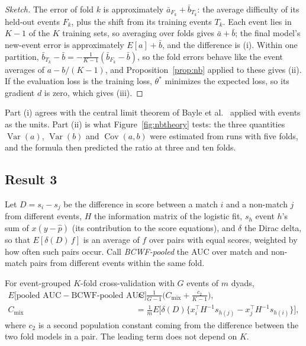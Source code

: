 \begin{proof}[Sketch]
The error of fold $k$ is approximately $\bar a_{F_k}+\bar b_{T_k}$: the average difficulty of its held-out events $F_k$, plus
the shift from its training events $T_k$. Each event lies in $K-1$ of the $K$ training sets, so averaging over folds gives
$\bar a+\bar b$; the final model's new-event error is approximately $E[a]+\bar b$, and the difference is (i). Within one
partition, $\bar b_{T_k}-\bar b=-\frac{1}{K-1}(\bar b_{F_k}-\bar b)$, so the fold errors behave like the event averages of $a-b/(K-1)$, and
Proposition~\ref{prop:nb} applied to these gives (ii). If the evaluation loss is the training loss, $\theta^*$ minimizes the
expected loss, so its gradient $d$ is zero, which gives (iii).
\end{proof}

Part (i) agrees with the central limit theorem of Bayle et al.\ \cite[Theorem 1]{Bayle:2020} applied with events as the
units. Part (ii) is what Figure~\ref{fig:nbtheory} tests: the three quantities $\operatorname{Var}(a)$, $\operatorname{Var}(b)$ and $\operatorname{Cov}(a,b)$ were
estimated from runs with five folds, and the formula then predicted the ratio at three and ten folds.

\subsection{Result 3}

Let $D=s_i-s_j$ be the difference in score between a match $i$ and a non-match $j$ from different events, $H$ the
information matrix of the logistic fit, $s_h$ event $h$'s sum of $x(y-\hat p)$ (its contribution to the score
equations), and $\delta$ the Dirac delta, so that $E[\delta(D)\,f]$ is an average of $f$ over pairs with equal scores,
weighted by how often such pairs occur. Call \emph{BCWF-pooled} the AUC over match and non-match pairs from different
events within the same fold.

\begin{prop}\label{prop:mix}
For event-grouped $K$-fold cross-validation with $G$ events of $m$ dyads,
\begin{align*}
E\big[\text{pooled AUC}-\text{BCWF-pooled AUC}\big]&\approx\frac{1}{G-1}\Big(C_{\mathrm{mix}}+\frac{c_2}{K-1}\Big),\\
C_{\mathrm{mix}}&=\frac1m E\big[\delta(D)\{x_i^\top H^{-1}s_{h(j)}-x_j^\top H^{-1}s_{h(i)}\}\big],
\end{align*}
where $c_2$ is a second population constant coming from the difference between the two fold models in a pair. The
leading term does not depend on $K$.
\end{prop}

